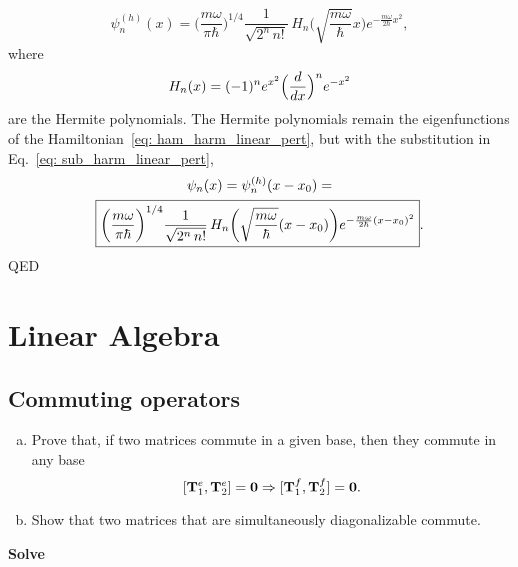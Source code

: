 \begin{enumerate}[(a)]
    \begin{equation}
        \psi_n^{(h)}(x) = \biggl( \frac{m \omega}{\pi \hbar} \biggr)^{1/4} \frac{1}{\sqrt{2^n \, n!}} \, H_n \biggl( \sqrt{\frac{m \omega}{\hbar}} x \biggr) e^{- \frac{m \omega}{2 \hbar} x^2},
    \end{equation}
    where 
    \begin{equation}
        \label{eq: rodr_herm}
        H_n (x) = (-1)^n e^{x^2} \Bigl( \frac{d}{dx} \Bigr)^n e^{-x^2}
    \end{equation}
    are the Hermite polynomials. The Hermite polynomials remain the eigenfunctions of the Hamiltonian~\eqref{eq: ham_harm_linear_pert}, but with the substitution in Eq.~\eqref{eq: sub_harm_linear_pert},
    \begin{gather}
        \psi_n(x) = \psi_n^{(h)}(x-x_0) = \notag \\ 
        \boxed{\biggl( \frac{m \omega}{\pi \hbar} \biggr)^{1/4} \frac{1}{\sqrt{2^n \, n!}} \, H_n \biggl( \sqrt{\frac{m \omega}{\hbar}} ( x - x_0 ) \biggr) e^{- \frac{m \omega}{2 \hbar} (x - x_0)^2}}.
    \end{gather}
    QED
\end{enumerate}
\section{Linear Algebra}
\subsection{Commuting operators}
\begin{enumerate}[(a)]
    \item Prove that, if two matrices commute in a given base, then they commute in any base
    \begin{equation}
        \label{eq: commutator_change_base}
        [ \mathbf{T}_1^e, \mathbf{T}_2^e ] = \mathbf{0} \Rightarrow [ \mathbf{T}_1^f, \mathbf{T}_2^f ] = \mathbf{0}.
    \end{equation}
    \item Show that two matrices that are simultaneously diagonalizable commute.
\end{enumerate}

\textbf{Solve}

